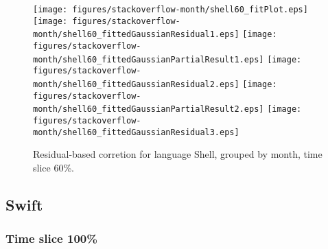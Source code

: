 \begin{figure}[t]
\centering
{}
{\texttt{[image: figures/stackoverflow-month/shell60\_fitPlot.eps]}}
{\texttt{[image: figures/stackoverflow-month/shell60\_fittedGaussianResidual1.eps]}}
{\texttt{[image: figures/stackoverflow-month/shell60\_fittedGaussianPartialResult1.eps]}}
{\texttt{[image: figures/stackoverflow-month/shell60\_fittedGaussianResidual2.eps]}}
{\texttt{[image: figures/stackoverflow-month/shell60\_fittedGaussianPartialResult2.eps]}}
{\texttt{[image: figures/stackoverflow-month/shell60\_fittedGaussianResidual3.eps]}}
\caption{Residual-based corretion for language Shell, grouped by month, time slice 60\%.}
\end{figure}


\FloatBarrier


\subsection{Swift}

\subsubsection{Time slice 100\%}

